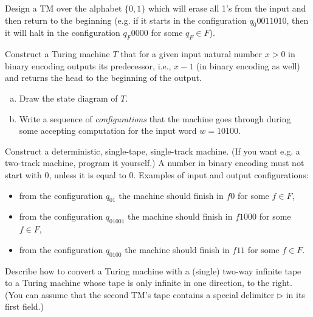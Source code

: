 \documentclass[a4paper,12pt]{amsart}
\begin{document}
\begin{problem}

    Design a TM over the alphabet $\{0,1\}$ which will erase all 1's from the input and then return to the beginning (e.g. if it starts in the configuration $q_0 0011010$, then it will halt in the configuration $q_F 0000$ for some $q_F\in F$).

\end{problem}


\begin{problem}[Predecessor]
	
    Construct a Turing machine $T$ that for a given input natural number $x>0$ in binary encoding outputs its predecessor, i.e., $x-1$ (in binary encoding as well) and returns the head to the beginning of the output. %
	
	\smallskip
	\begin{enumerate}[(a)]
	
		\item Draw the state diagram of $T$.
		\item Write a sequence of \emph{configurations} that the machine goes through during some accepting computation for the input word $w=10100$.

	\end{enumerate}

	Construct a deterministic, single-tape, single-track machine. (If you want e.g. a two-track machine, program it yourself.) A number in binary encoding must not start with 0, unless it is equal to 0. Examples of input and output configurations:	
	
	\begin{itemize}
	
		\item from the configuration $q_01$ the machine should finish in $f0$ for some $f\in F$,
		\item from the configuration $q_01001$ the machine should finish in $f1000$ for some $f\in F$,
		\item from the configuration  $q_0100$ the machine should finish in $f11$ for some $f\in F$.
	\end{itemize}

\end{problem}


\begin{problem}

    Describe how to convert a Turing machine with a (single) two-way infinite tape to a Turing machine whose tape is only infinite in one direction, to the right. (You can assume that the second TM's tape contains a special delimiter $\triangleright$ in its first field.)

\end{problem}
\end{document}
